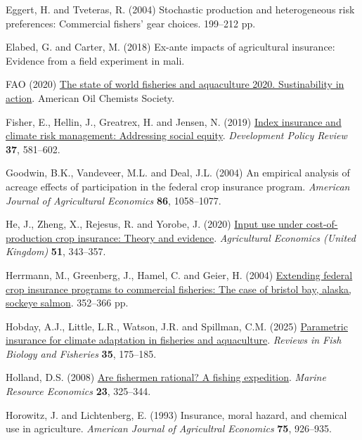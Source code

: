 \documentclass[
  letterpaper,
  DIV=11,
  numbers=noendperiod]{scrartcl}
\newlength{\cslhangindent}
\newenvironment{CSLReferences}[2] %
 {\begin{list}{}{%
  \setlength{\itemindent}{0pt}
  \setlength{\leftmargin}{0pt}
  \setlength{\parsep}{0pt}
  \ifodd #1
   \setlength{\leftmargin}{\cslhangindent}
   \setlength{\itemindent}{-1\cslhangindent}
  \fi
  \setlength{\itemsep}{#2\baselineskip}}}
 {\end{list}}
\theoremstyle{plain}
\theoremstyle{plain}
\theoremstyle{remark}
\begin{document}
\begin{CSLReferences}{1}{0}
Eggert, H. and Tveteras, R. (2004) Stochastic production and
heterogeneous risk preferences: Commercial fishers' gear choices.
199--212 pp.

Elabed, G. and Carter, M. (2018) Ex-ante impacts of agricultural
insurance: Evidence from a field experiment in mali.

FAO (2020) \href{https://doi.org/10.4060/ca9229en}{The state of world
fisheries and aquaculture 2020. Sustinability in action}. American Oil
Chemists Society.

Fisher, E., Hellin, J., Greatrex, H. and Jensen, N. (2019)
\href{https://doi.org/10.1111/dpr.12387}{Index insurance and climate
risk management: Addressing social equity}. \emph{Development Policy
Review} \textbf{37}, 581--602.

Goodwin, B.K., Vandeveer, M.L. and Deal, J.L. (2004) An empirical
analysis of acreage effects of participation in the federal crop
insurance program. \emph{American Journal of Agricultural Economics}
\textbf{86}, 1058--1077.

He, J., Zheng, X., Rejesus, R. and Yorobe, J. (2020)
\href{https://doi.org/10.1111/AGEC.12558}{Input use under
cost-of-production crop insurance: Theory and evidence}.
\emph{Agricultural Economics (United Kingdom)} \textbf{51}, 343--357.

Herrmann, M., Greenberg, J., Hamel, C. and Geier, H. (2004)
\href{https://doi.org/10.1577/M02-086.1}{Extending federal crop
insurance programs to commercial fisheries: The case of bristol bay,
alaska, sockeye salmon}. 352--366 pp.

Hobday, A.J., Little, L.R., Watson, J.R. and Spillman, C.M. (2025)
\href{https://doi.org/10.1007/s11160-025-09920-3}{Parametric insurance
for climate adaptation in fisheries and aquaculture}. \emph{Reviews in
Fish Biology and Fisheries} \textbf{35}, 175--185.

Holland, D.S. (2008)
\href{https://doi.org/10.1086/mre.23.3.42629621}{Are fishermen rational?
A fishing expedition}. \emph{Marine Resource Economics} \textbf{23},
325--344.

Horowitz, J. and Lichtenberg, E. (1993) Insurance, moral hazard, and
chemical use in agriculture. \emph{American Journal of Agricultral
Economics} \textbf{75}, 926--935.


\end{CSLReferences}
\end{document}
